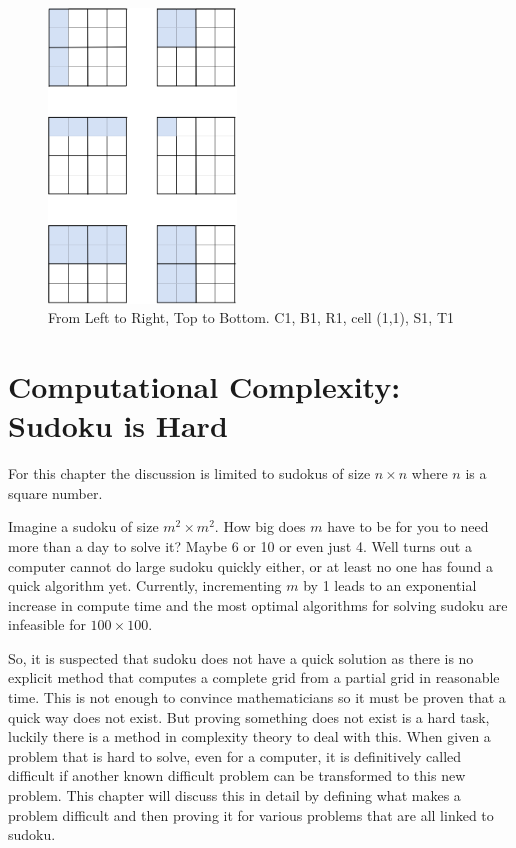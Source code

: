 \documentclass[a4paper,11pt]{report}
\begin{document}
\begin{figure}[h!]
\begin{center}
\includegraphics[width=50mm]{figures/highlighted_cells.png}
\end{center}
\caption{\label{fig:labels}From Left to Right, Top to Bottom. C1, B1, R1, cell (1,1), S1, T1 }
\end{figure}

\chapter{Computational Complexity: Sudoku is Hard}

For this chapter the discussion is limited to sudokus of size $n \times n$ where $n$ is a square number.

Imagine a sudoku of size $m^2\times m^2$. How big does $m$ have to be for you to need more than a day to solve it? Maybe 6 or 10 or even just 4. Well turns out a computer cannot do large sudoku quickly either, or at least no one has found a quick algorithm yet. Currently, incrementing $m$ by 1 leads to an exponential increase in compute time and the most optimal algorithms for solving sudoku are infeasible for $100 \times 100$.

So, it is suspected that sudoku does not have a quick solution as there is no explicit method that computes a complete grid from a partial grid in reasonable time. This is not enough to convince mathematicians so it must be proven that a quick way does not exist. But proving something does not exist is a hard task, luckily there is a method in complexity theory to deal with this. When given a problem that is hard to solve, even for a computer, it is definitively called difficult if another known difficult problem can be transformed to this new problem. This chapter will discuss this in detail by defining what makes a problem difficult and then proving it for various problems that are all linked to sudoku. 
\end{document}
